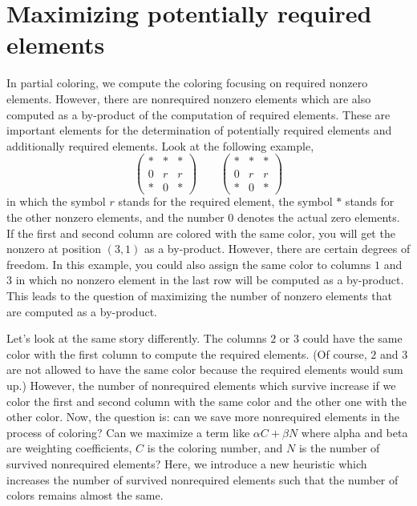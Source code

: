 \documentclass[12pt, twoside,a4paper,toc=bibliography]{scrbook}
\begin{document}
\section{Maximizing potentially required elements}
\label{s.max.pot.req}
In partial coloring, we compute the coloring focusing on
required nonzero elements. However, there are nonrequired nonzero elements
which are also computed as a by-product of the computation of required elements.
These are important elements for the determination of potentially required elements
and additionally required elements. Look at the following example,
\begin{equation}
\left(\begin{array}{rrb}
* & * & *\\
0 & r & r \\
* & 0 & *
\end{array}\right)
\qquad
\left(\begin{array}{rbr}
* & * & *\\
0 & r & r \\
* & 0 & *
\end{array}\right)
\label{twocolorings}
\end{equation}
in which the symbol $r$ stands for the required element,
the symbol \textit{$*$} stands for the other nonzero elements,
and the number $0$ denotes the actual zero elements.
If the first and second column are colored with the same color,
you will get the nonzero at position $(3,1)$ as a by-product.
However, there are certain degrees of freedom. In
this example, you could also assign the same color to columns $1$ and
$3$ in which no nonzero element in the last row will be computed
as a by-product. This leads to the question of maximizing
the number of nonzero elements that are computed as a by-product.

Let's look at the same story differently.
The columns $2$ or $3$ could have the same color with the first column to compute the
required elements. (Of course, $2$ and $3$ are not allowed to have the same color
because the required elements would sum up.)
However, the number of nonrequired elements which survive increase if
we color the first and second column with the same color and the
other one with the other color. Now, the question is: can we save
more nonrequired elements in the process of coloring? Can we maximize a term like $\alpha C + \beta N$ where alpha and beta are
weighting coefficients, $C$ is the coloring number, and $N$ is the
number of survived nonrequired elements?
Here, we introduce a new heuristic which increases the number of survived nonrequired elements such that the number of colors remains almost the same.
\end{document}
